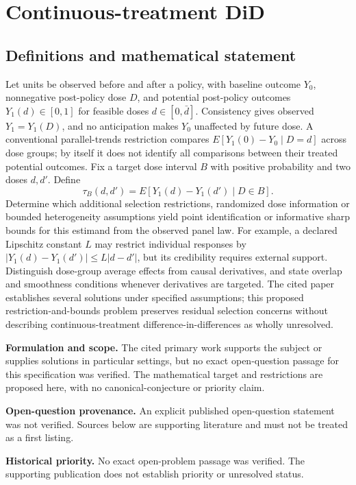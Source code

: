 \documentclass[11pt]{article}
\begin{document}
\section*{Continuous-treatment DiD}\label{30007705}
\subsection{Definitions and mathematical statement}
Let units be observed before and after a policy, with baseline outcome \(Y_0\), nonnegative post-policy dose \(D\), and potential post-policy outcomes \(Y_1(d)\in[0,1]\) for feasible doses \(d\in[0,\bar d]\). Consistency gives observed \(Y_1=Y_1(D)\), and no anticipation makes \(Y_0\) unaffected by future dose. A conventional parallel-trends restriction compares \(E[Y_1(0)-Y_0\mid D=d]\) across dose groups; by itself it does not identify all comparisons between their treated potential outcomes. Fix a target dose interval \(B\) with positive probability and two doses \(d,d'\). Define
\[
\tau_B(d,d')=E[Y_1(d)-Y_1(d')\mid D\in B].
\]
Determine which additional selection restrictions, randomized dose information or bounded heterogeneity assumptions yield point identification or informative sharp bounds for this estimand from the observed panel law. For example, a declared Lipschitz constant \(L\) may restrict individual responses by \(|Y_1(d)-Y_1(d')|\leq L|d-d'|\), but its credibility requires external support. Distinguish dose-group average effects from causal derivatives, and state overlap and smoothness conditions whenever derivatives are targeted. The cited paper establishes several solutions under specified assumptions; this proposed restriction-and-bounds problem preserves residual selection concerns without describing continuous-treatment difference-in-differences as wholly unresolved.

\par\textbf{Formulation and scope.} The cited primary work supports the subject or supplies solutions in particular settings, but no exact open-question passage for this specification was verified. The mathematical target and restrictions are proposed here, with no canonical-conjecture or priority claim.

\par\textbf{Open-question provenance.} An explicit published open-question statement was not verified. Sources below are supporting literature and must not be treated as a first listing.

\par\textbf{Historical priority.} No exact open-problem passage was verified. The supporting publication does not establish priority or unresolved status.
\end{document}
